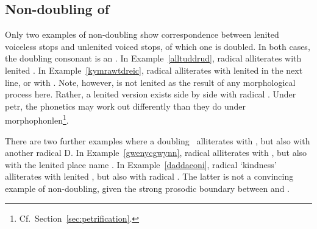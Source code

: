 \subsection{Non-doubling of \xD}
\label{sec:non-doubling-radical}
Only two examples of non-doubling show correspondence between lenited voiceless stops and unlenited voiced stops, of which one is doubled. In both cases, the doubling consonant is an \xD.
In Example~\ref{alltuddrud}, radical  alliterates with lenited . In Example~\ref{kymrawtdreic},  radical  alliterates with lenited  in the next line, or with . Note, however,  is not lenited as the result of any morphological process here. Rather, a lenited version exists side by side with radical . Under \gls{petr}, the phonetics may work out differently than they do under \gls{morphophonlen}\footnote{Cf.\  Section~\ref{sec:petrification}.}.
\begin{mwl}
\end{mwl}


There are two further examples where a doubling \xD\ alliterates with \lT, but also with another radical \gls{D}. In Example~\ref{gwenycgwynn}, radical  alliterates with , but also with the lenited place name . In Example~\ref{daddaeoni}, radical  `kindness' alliterates with  lenited , but also with radical . The latter is not a convincing example of non-doubling, given the strong  prosodic boundary between  and .
\begin{mwl}
\end{mwl}


